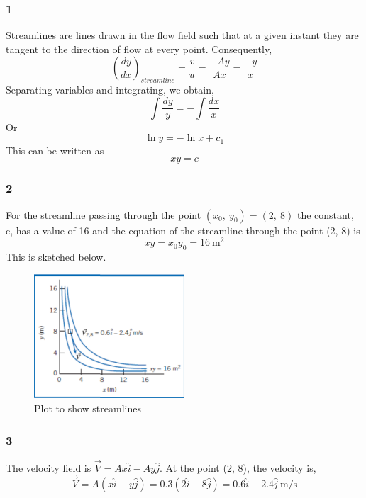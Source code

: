 \documentclass[class=report, crop=false, 12pt,a4paper]{standalone}
\begin{document}
\subsubsection{1}
Streamlines are lines drawn in the flow field such that at a given instant they are tangent to the direction of flow at every point. Consequently,
\begin{equation}
  \left( \frac{dy}{dx} \right)_{streamline} = \frac{v}{u} = \frac{-Ay}{Ax} = \frac{-y}{x}
\end{equation}
Separating variables and integrating, we obtain,
\begin{equation}
  \int \frac{dy}{y} = - \int \frac{dx}{x}
\end{equation}
Or
\begin{equation}
  \ln{y} = - \ln{x} + c_1
\end{equation}
This can be written as
\begin{equation}
  xy = c
\end{equation}
\subsubsection{2}
For the streamline passing through the point $(x_0, \ y_0) = (2, \ 8)$ the constant, c, has a value of 16 and the equation of the streamline through the point (2, 8) is
\begin{equation}
  xy = x_0y_0 = 16 \ \si{\meter\squared}
\end{equation}
This is sketched below.
\begin{figure}[h]
  \centering
  \includegraphics[width = 0.5\textwidth]{../img/streamlineexampleqgraph}
  \caption{Plot to show streamlines}
\end{figure}
\subsubsection{3}
The velocity field is $\vec{V} = Ax\hat{i} - Ay\hat{j}$. At the point (2, 8), the velocity is,
\begin{equation}
  \vec{V} = A(x\hat{i} - y\hat{j}) = 0.3(2\hat{i} - 8 \hat{j}) = 0.6\hat{i} - 2.4\hat{j} \ \si{\meter\per\second}
\end{equation}
\end{document}
